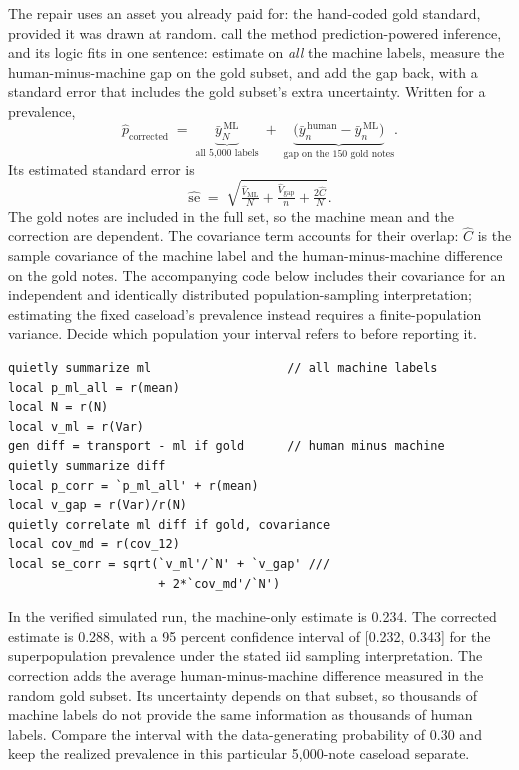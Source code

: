 \documentclass[
    a4paper,
    fontsize=10pt,
    twoside=true,
    numbers=noenddot,
]{kaobook}
\begin{document}
The repair uses an asset you already paid for: the hand-coded gold standard, provided it was drawn at random. \textcite{angelopoulos2023ppi} call the method prediction-powered inference, and its logic fits in one sentence: estimate on \emph{all} the machine labels, measure the human-minus-machine gap on the gold subset, and add the gap back, with a standard error that includes the gold subset's extra uncertainty. Written for a prevalence,
\[
\hat{p}_{\text{corrected}}
\;=\;
\underbrace{\bar{y}^{\,\text{ML}}_{N}}_{\text{all 5{,}000 labels}}
\;+\;
\underbrace{\bigl(\bar{y}^{\,\text{human}}_{n} - \bar{y}^{\,\text{ML}}_{n}\bigr)}_{\text{gap on the 150 gold notes}}.
\]
Its estimated standard error is
\[
\widehat{\text{se}}
\;=\;
\sqrt{\tfrac{\widehat{V}_{\text{ML}}}{N} + \tfrac{\widehat{V}_{\text{gap}}}{n} + \tfrac{2\widehat C}{N}}.
\]
The gold notes are included in the full set, so the machine mean and the correction are dependent. The covariance term accounts for their overlap: $\widehat C$ is the sample covariance of the machine label and the human-minus-machine difference on the gold notes. The accompanying code below includes their covariance for an independent and identically distributed population-sampling interpretation; estimating the fixed caseload's prevalence instead requires a finite-population variance. Decide which population your interval refers to before reporting it.
\par
{\footnotesize
\begin{verbatim}
quietly summarize ml                   // all machine labels
local p_ml_all = r(mean)
local N = r(N)
local v_ml = r(Var)
gen diff = transport - ml if gold      // human minus machine
quietly summarize diff
local p_corr = `p_ml_all' + r(mean)
local v_gap = r(Var)/r(N)
quietly correlate ml diff if gold, covariance
local cov_md = r(cov_12)
local se_corr = sqrt(`v_ml'/`N' + `v_gap' ///
                     + 2*`cov_md'/`N')
\end{verbatim}
}
In the verified simulated run, the machine-only estimate is 0.234. The corrected estimate is 0.288, with a 95 percent confidence interval of [0.232, 0.343] for the superpopulation prevalence under the stated iid sampling interpretation. The correction adds the average human-minus-machine difference measured in the random gold subset. Its uncertainty depends on that subset, so thousands of machine labels do not provide the same information as thousands of human labels. Compare the interval with the data-generating probability of 0.30 and keep the realized prevalence in this particular 5{,}000-note caseload separate.
\end{document}
